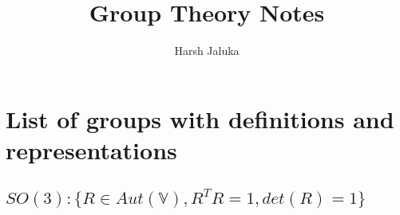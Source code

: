 \documentclass[11pt]{article}
\title{Group Theory Notes}
\author{Harsh Jaluka}
\date{}
\begin{document}
\begin{titlepage}
\maketitle 
\end{titlepage}

\newpage 
\tableofcontents

\newpage
\section{List of groups with definitions and representations}

\subsection{$SO(3): \{R \in Aut(\mathbb{V}), R^TR = 1, det(R) = 1 \}$}
\end{document}
